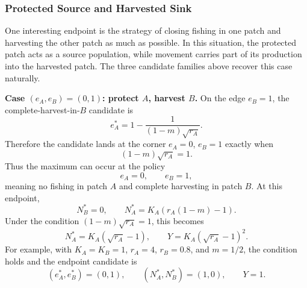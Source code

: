 \documentclass{article}
\numberwithin{equation}{section}
\begin{document}
\subsubsection{Protected Source and Harvested Sink}
One interesting endpoint is the strategy of closing fishing in one patch
and harvesting the other patch as much as possible. In this situation,
the protected patch acts as a source population, while movement carries
part of its production into the harvested patch. The three candidate
families above recover this case naturally.

\noindent\textbf{Case $(e_A,e_B)=(0,1)$: protect $A$, harvest $B$.}
On the edge $e_B=1$, the complete-harvest-in-$B$ candidate is
\begin{equation*}
    e_A^*=1-\frac{1}{(1-m)\sqrt{r_A}}.
\end{equation*}
Therefore the candidate lands at the corner $e_A=0$, $e_B=1$ exactly
when
\begin{equation*}
    (1-m)\sqrt{r_A}=1.
\end{equation*}
Thus the maximum can occur at the policy
\begin{equation*}
    e_A=0,
    \qquad
    e_B=1,
\end{equation*}
meaning no fishing in patch $A$ and complete harvesting in patch $B$. At
this endpoint,
\begin{equation*}
    N_B^*=0,
    \qquad
    N_A^*=K_A\left(r_A(1-m)-1\right).
\end{equation*}
Under the condition $(1-m)\sqrt{r_A}=1$, this becomes
\begin{equation*}
    N_A^*=K_A(\sqrt{r_A}-1),
    \qquad
    Y=K_A(\sqrt{r_A}-1)^2.
\end{equation*}
For example, with $K_A=K_B=1$, $r_A=4$, $r_B=0.8$, and $m=1/2$, the
condition holds and the endpoint candidate is
\begin{equation*}
    (e_A^*,e_B^*)=(0,1),
    \qquad
    (N_A^*,N_B^*)=(1,0),
    \qquad
    Y=1.
\end{equation*}
\end{document}
